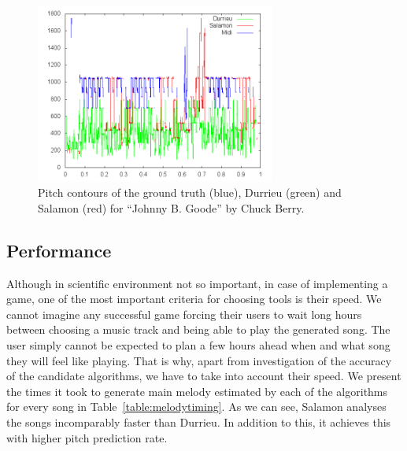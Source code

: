 \begin{figure}[b]
	\centering
   \includegraphics[width=0.7\textwidth]{Figures/Johnny}
\caption{Pitch contours of the ground truth (blue), Durrieu (green) and Salamon (red) for ``Johnny B. Goode'' by Chuck Berry.}
\label{fig:jonny}
\end{figure}



\vspace{10pt}

\subsection{Performance}

Although in scientific environment not so important, in case of implementing a game, one of the most important criteria for choosing tools is their speed. We cannot imagine any successful game forcing their users to wait long hours between choosing a music track and being able to play the generated song. The user simply cannot be expected to plan a few hours ahead when and what song they will feel like playing. That is why, apart from investigation of the accuracy of the candidate algorithms, we have to take into account their speed. We present the times it took to generate main melody estimated by each of the algorithms for every song in Table~\ref{table:melodytiming}. As we can see, Salamon analyses the songs incomparably faster than Durrieu. In addition to this, it achieves this with higher pitch prediction rate.


\vspace{20pt}

